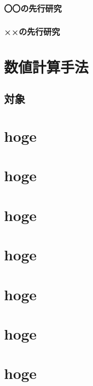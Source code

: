 \documentclass[
    openany,oneside,
    paper=a4paper,
    book,
    fontsize=12pt,
    jafontsize=12pt,
    head_space=30mm]{jlreq}
\begin{document}
\lipsum[1-2]

\subsection{〇〇の先行研究}
\label{ssec:marumaru}

\lipsum[1-4]

\subsection{××の先行研究}
\label{ssec:batsubatsu}

\lipsum[1-4]

\chapter{数値計算手法}
\label{ch:method}

\lipsum[1]

\section{対象}
\label{sec:target}

\lipsum[1-8]


\chapter{hoge}

\chapter{hoge}

\chapter{hoge}

\chapter{hoge}

\chapter{hoge}

\chapter{hoge}

\chapter{hoge}
\end{document}
